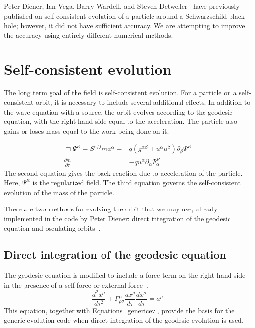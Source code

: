 Peter Diener, Ian Vega, Barry Wardell, and Steven Detweiler~\cite{diener_vega_wardell_detwieler_2012} have previously published on self-consistent evolution of a particle around a Schwarzschild black-hole; however, it did not have sufficient accuracy. We are attempting to improve the accuracy using entirely different numerical methods.

\section{Self-consistent evolution}



The long term goal of the field is self-consistent evolution. For a particle on a self-consistent orbit, it is necessary to include several additional effects. In addition to the wave equation with a source, the orbit evolves according to the geodesic equation, with the right hand side equal to the acceleration. The particle also gains or loses mass equal to the work being done on it. 

\begin{eqnarray}
  \Box\Psi^{R} =S^{eff}
    ma^\alpha=&q(g^{\alpha\beta}+u^\alpha u^\beta)\partial_\beta\Psi^{R}\nonumber\\
    \frac{\partial m}{\partial \tau}=&-q u^\alpha\partial_\alpha \Psi^R_\alpha
    \label{genericev}
\end{eqnarray}
The second equation gives the back-reaction due to acceleration of the particle. Here, $\Psi^R$ is the regularized field. The third equation governs the self-consistent evolution of the mass of the particle.~\cite{WardellSelfForceReview}

There are two methods for evolving the orbit that we may use, already implemented in the code by Peter Diener: direct integration of the geodesic equation and osculating orbits~\cite{pound_poisson}.

\subsection{Direct integration of the geodesic equation}
The geodesic equation is modified to include a force term on the right hand side in the presence of a self-force or external force~\cite{Carroll}.
\begin{equation}
  \frac{d^2x^\mu}{d\tau^2}+\Gamma^\mu_{\rho\sigma}\frac{dx^\rho}{d\tau}\frac{dx^\sigma}{d\tau}=a^\mu
\end{equation}
This equation, together with Equations~\ref{genericev}, provide the basis for the generic evolution code when direct integration of the geodesic evolution is used. 

